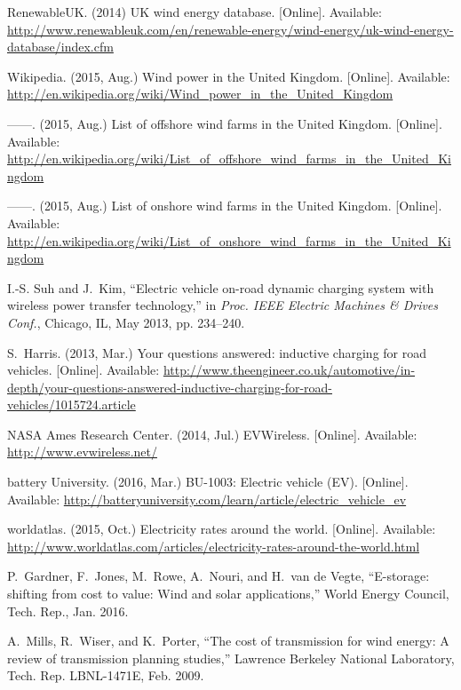 \documentclass[journal]{IEEEtran}
\begin{document}
\begin{thebibliography}{1}
RenewableUK. (2014) {UK} wind energy database. [Online]. Available:
  \url{http://www.renewableuk.com/en/renewable-energy/wind-energy/uk-wind-energy-database/index.cfm}


Wikipedia. (2015, Aug.) Wind power in the {United Kingdom}. [Online].
  Available:
  \url{http://en.wikipedia.org/wiki/Wind_power_in_the_United_Kingdom}


------. (2015, Aug.) List of offshore wind farms in the {United Kingdom}.
  [Online]. Available:
  \url{http://en.wikipedia.org/wiki/List_of_offshore_wind_farms_in_the_United_Kingdom}


------. (2015, Aug.) List of onshore wind farms in the {United Kingdom}.
  [Online]. Available:
  \url{http://en.wikipedia.org/wiki/List_of_onshore_wind_farms_in_the_United_Kingdom}


I.-S. Suh and J.~Kim, ``Electric vehicle on-road dynamic charging system with
  wireless power transfer technology,'' in \emph{Proc. IEEE Electric Machines
  \& Drives Conf.}, Chicago, IL, May 2013, pp. 234--240.

S.~Harris. (2013, Mar.) Your questions answered: inductive charging for road
  vehicles. [Online]. Available:
  \url{http://www.theengineer.co.uk/automotive/in-depth/your-questions-answered-inductive-charging-for-road-vehicles/1015724.article}


{NASA Ames Research Center}. (2014, Jul.) {EVWireless}. [Online]. Available:
  \url{http://www.evwireless.net/}


battery University. (2016, Mar.) {BU}-1003: Electric vehicle {(EV)}. [Online].
  Available:
  \url{http://batteryuniversity.com/learn/article/electric_vehicle_ev}


worldatlas. (2015, Oct.) Electricity rates around the world. [Online].
  Available:
  \url{http://www.worldatlas.com/articles/electricity-rates-around-the-world.html}


P.~Gardner, F.~Jones, M.~Rowe, A.~Nouri, and H.~{van de Vegte}, ``E-storage:
  shifting from cost to value: Wind and solar applications,'' World Energy
  Council, Tech. Rep., Jan. 2016.

A.~Mills, R.~Wiser, and K.~Porter, ``The cost of transmission for wind energy:
  A review of transmission planning studies,'' Lawrence Berkeley National
  Laboratory, Tech. Rep. LBNL-1471E, Feb. 2009.


\end{thebibliography}
\end{document}
